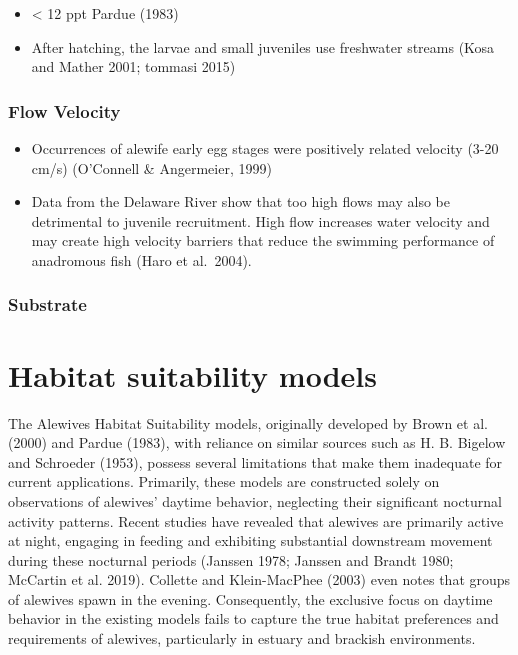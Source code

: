 \documentclass[
]{book}
\begin{document}
\begin{itemize}
\item
  \textless{} 12 ppt Pardue (1983)
\item
  After hatching, the larvae and small juveniles use freshwater streams (Kosa and Mather 2001; tommasi 2015)
\end{itemize}

\hypertarget{flow-velocity-2}{%
\subsubsection{Flow Velocity}\label{flow-velocity-2}}

\begin{itemize}
\item
  Occurrences of alewife early egg stages were positively related velocity (3-20 cm/s) (O'Connell \& Angermeier, 1999)
\item
  Data from the Delaware River show that too high flows may also be detrimental to juvenile recruitment. High flow increases water velocity and may create high velocity barriers that reduce the swimming performance of anadromous fish (Haro et al.~2004).
\end{itemize}

\hypertarget{substrate-2}{%
\subsubsection{Substrate}\label{substrate-2}}

\hypertarget{habitat-suitability-models}{%
\section{Habitat suitability models}\label{habitat-suitability-models}}

The Alewives Habitat Suitability models, originally developed by Brown et al. (2000) and Pardue (1983), with reliance on similar sources such as H. B. Bigelow and Schroeder (1953), possess several limitations that make them inadequate for current applications.
Primarily, these models are constructed solely on observations of alewives' daytime behavior, neglecting their significant nocturnal activity patterns.
Recent studies have revealed that alewives are primarily active at night, engaging in feeding and exhibiting substantial downstream movement during these nocturnal periods (Janssen 1978; Janssen and Brandt 1980; McCartin et al. 2019).
Collette and Klein-MacPhee (2003) even notes that groups of alewives spawn in the evening.
Consequently, the exclusive focus on daytime behavior in the existing models fails to capture the true habitat preferences and requirements of alewives, particularly in estuary and brackish environments.
\end{document}
